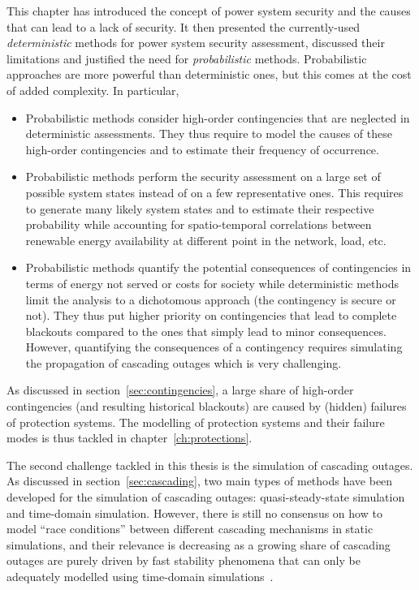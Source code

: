 This chapter has introduced the concept of power system security and the causes that can lead to a lack of security. It then presented the currently-used \emph{deterministic} methods for power system security assessment, discussed their limitations and justified the need for \emph{probabilistic} methods. Probabilistic approaches are more powerful than deterministic ones, but this comes at the cost of added complexity. In particular,

\begin{itemize}
    \item Probabilistic methods consider high-order contingencies that are neglected in deterministic assessments. They thus require to model the causes of these high-order contingencies and to estimate their frequency of occurrence.
    \item Probabilistic methods perform the security assessment on a large set of possible system states instead of on a few representative ones. This requires to generate many likely system states and to estimate their respective probability while accounting for spatio-temporal correlations between renewable energy availability at different point in the network, load, etc.
    \item Probabilistic methods quantify the potential consequences of contingencies in terms of energy not served or costs for society while deterministic methods limit the analysis to a dichotomous approach (the contingency is secure or not). They thus put higher priority on contingencies that lead to complete blackouts compared to the ones that simply lead to minor consequences. However, quantifying the consequences of a contingency requires simulating the propagation of cascading outages which is very challenging.
\end{itemize}

As discussed in section~\ref{sec:contingencies}, a large share of high-order contingencies (and resulting historical blackouts) are caused by (hidden) failures of protection systems. The modelling of protection systems and their failure modes is thus tackled in chapter~\ref{ch:protections}.

The second challenge tackled in this thesis is the simulation of cascading outages. As discussed in section~\ref{sec:cascading}, two main types of methods have been developed for the simulation of cascading outages: quasi-steady-state simulation and time-domain simulation. However, there is still no consensus on how to model ``race conditions'' between different cascading mechanisms in static simulations, and their relevance is decreasing as a growing share of cascading outages are purely driven by fast stability phenomena that can only be adequately modelled using time-domain simulations~\cite{cascadeAcceleration}.

